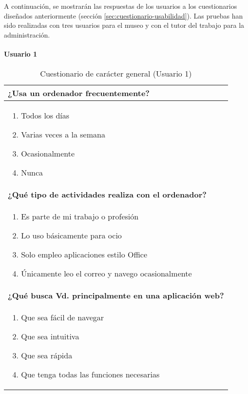 A continuación, se mostrarán las respuestas de los usuarios a los cuestionarios diseñados anteriormente (sección \ref{sec:cuestionario-usabilidad}). Las pruebas han sido realizadas con tres usuarios para el museo y con el tutor del trabajo para la administración.
\paragraph*{Usuario 1}
\begin{table}[H]
\centering
\caption{Cuestionario de carácter general (Usuario 1)}
\begin{tabular}{p{36em}}
\toprule
\rowcolor[rgb]{ .949,  .949,  .949} \textbf{¿Usa un ordenador frecuentemente?} \\ \midrule
\vspace{-4mm}
\begin{enumerate}
\item \colorbox{blue!30}{Todos los días}
\item Varias veces a la semana
\item Ocasionalmente
\item Nunca
\end{enumerate} \\ \midrule
\rowcolor[rgb]{ .949,  .949,  .949} \textbf{¿Qué tipo de actividades realiza con el ordenador?} \\ \midrule
\vspace{-4mm}
\begin{enumerate}
\item Es parte de mi trabajo o profesión
\item \colorbox{blue!30}{Lo uso básicamente para ocio}
\item Solo empleo aplicaciones estilo Office
\item Únicamente leo el correo y navego ocasionalmente
\end{enumerate} \\ \midrule
\rowcolor[rgb]{ .949,  .949,  .949} \textbf{¿Qué busca Vd. principalmente en una aplicación web?} \\ \midrule
\vspace{-4mm}
\begin{enumerate}
\item \colorbox{blue!30}{Que sea fácil de navegar}
\item Que sea intuitiva
\item Que sea rápida
\item Que tenga todas las funciones necesarias
\end{enumerate} \\ \bottomrule
\end{tabular}
\end{table}

